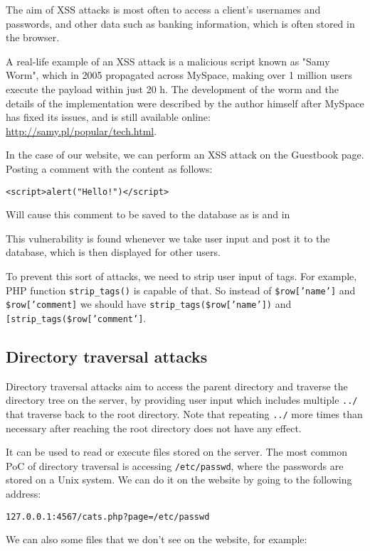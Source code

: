 \documentclass[11pt,journal]{article}
\begin{document}
	The aim of XSS attacks is most often to access a client's usernames and passwords, and other data such as banking information, which is often stored in the browser.
	
	A real-life example of an XSS attack is a malicious script known as "Samy Worm", which in 2005 propagated across MySpace, making over 1 million users execute the payload within just 20 h. The  development of the worm and the details of the implementation were described by the author himself after MySpace has fixed its issues, and is still available online: \url{http://samy.pl/popular/tech.html}.
	
	In the case of our website, we can perform an XSS attack on the Guestbook page. Posting a comment with the content as follows:
	
	\texttt{<script>alert("Hello!")</script>}
	
	Will cause this comment to be saved to the database as is and in
	
	This vulnerability is found whenever we take user input and post it to the database, which is then displayed for other users.
	
	To prevent this sort of attacks, we need to strip user input of tags. For example, PHP function \texttt{strip\_tags()} is capable of that. So instead of \texttt{\$row['name']} and \texttt{\$row['comment]} we should have \texttt{strip\_tags(\$row['name'])} and \texttt{[strip\_tags(\$row['comment']}.
	
	\subsection{Directory traversal attacks}
	Directory traversal attacks aim to access the parent directory and traverse the directory tree on the server, by providing user input which includes multiple \texttt{../} that traverse back to the root directory. Note that repeating \texttt{../} more times than necessary after reaching the root directory does not have any effect.
	
	It can be used to read or execute files stored on the server. The most common PoC of directory traversal is accessing \texttt{/etc/passwd}, where the passwords are stored on a Unix system. We can do it on the website by going to the following address:
	
	\texttt{127.0.0.1:4567/cats.php?page=/etc/passwd}
	
	We can also some files that we don't see on the website, for example:
	
\end{document}
